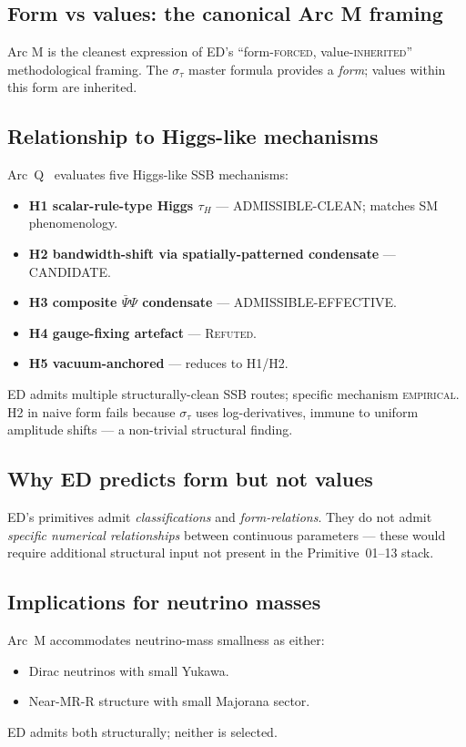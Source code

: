 \documentclass[11pt,a4paper]{article}
\begin{document}
\subsection{Form vs values: the canonical Arc M framing}

Arc M is the cleanest expression of ED's ``form-\textsc{forced}, value-\textsc{inherited}'' methodological framing. The $\sigma_\tau$ master formula provides a \emph{form}; values within this form are inherited.

\subsection{Relationship to Higgs-like mechanisms}

Arc~Q~\cite{arcq} evaluates five Higgs-like SSB mechanisms:
\begin{itemize}
  \item \textbf{H1 scalar-rule-type Higgs $\tau_H$} --- ADMISSIBLE-CLEAN; matches SM phenomenology.
  \item \textbf{H2 bandwidth-shift via spatially-patterned condensate} --- CANDIDATE.
  \item \textbf{H3 composite $\bar\Psi\Psi$ condensate} --- ADMISSIBLE-EFFECTIVE.
  \item \textbf{H4 gauge-fixing artefact} --- \textsc{Refuted}.
  \item \textbf{H5 vacuum-anchored} --- reduces to H1/H2.
\end{itemize}
ED admits multiple structurally-clean SSB routes; specific mechanism \textsc{empirical}. H2 in naive form fails because $\sigma_\tau$ uses log-derivatives, immune to uniform amplitude shifts --- a non-trivial structural finding.

\subsection{Why ED predicts form but not values}

ED's primitives admit \emph{classifications} and \emph{form-relations}. They do not admit \emph{specific numerical relationships} between continuous parameters --- these would require additional structural input not present in the Primitive~01--13 stack.

\subsection{Implications for neutrino masses}

Arc~M accommodates neutrino-mass smallness as either:
\begin{itemize}
  \item Dirac neutrinos with small Yukawa.
  \item Near-MR-R structure with small Majorana sector.
\end{itemize}
ED admits both structurally; neither is selected.
\end{document}
